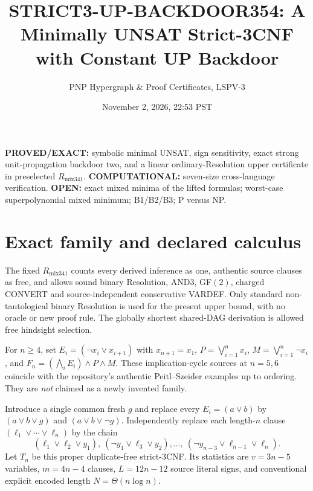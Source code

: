 \documentclass[11pt]{article}
\title{STRICT3-UP-BACKDOOR354: A Minimally UNSAT Strict-3CNF with Constant UP Backdoor}
\author{PNP Hypergraph \& Proof Certificates, LSPV-3}
\date{November 2, 2026, 22:53 PST}
\begin{document}
\maketitle
\noindent\textbf{PROVED/EXACT:} symbolic minimal UNSAT, sign sensitivity, exact strong unit-propagation backdoor two, and a linear ordinary-Resolution upper certificate in preselected $R_{\mathrm{mix341}}$. \textbf{COMPUTATIONAL:} seven-size cross-language verification. \textbf{OPEN:} exact mixed minima of the lifted formulas; worst-case superpolynomial mixed minimum; B1/B2/B3; P versus NP.

\section*{Exact family and declared calculus}
The fixed $R_{\mathrm{mix341}}$ counts every derived inference as one, authentic source clauses as free, and allows sound binary Resolution, AND3, GF$(2)$, charged CONVERT and source-independent conservative VARDEF. Only standard non-tautological binary Resolution is used for the present upper bound, with no oracle or new proof rule. The globally shortest shared-DAG derivation is allowed free hindsight selection.

For $n\ge4$, set $E_i=(\neg x_i\vee x_{i+1})$ with $x_{n+1}=x_1$, $P=\bigvee_{i=1}^n x_i$, $M=\bigvee_{i=1}^n\neg x_i$, and $F_n=(\bigwedge_iE_i)\wedge P\wedge M$. These implication-cycle sources at $n=5,6$ coincide with the repository's authentic Peitl--Szeider examples up to ordering. They are \emph{not} claimed as a newly invented family.

Introduce a single common fresh $g$ and replace every $E_i=(a\vee b)$ by $(a\vee b\vee g)$ and $(a\vee b\vee\neg g)$. Independently replace each length-$n$ clause $(\ell_1\vee\cdots\vee\ell_n)$ by the chain
\[
(\ell_1\vee\ell_2\vee y_1),\
(\neg y_1\vee\ell_3\vee y_2),\ldots,\
(\neg y_{n-3}\vee\ell_{n-1}\vee\ell_n).
\]
Let $T_n$ be this proper duplicate-free strict-3CNF. Its statistics are $v=3n-5$ variables, $m=4n-4$ clauses, $L=12n-12$ source literal signs, and conventional explicit encoded length $N=\Theta(n\log n)$.
\end{document}
